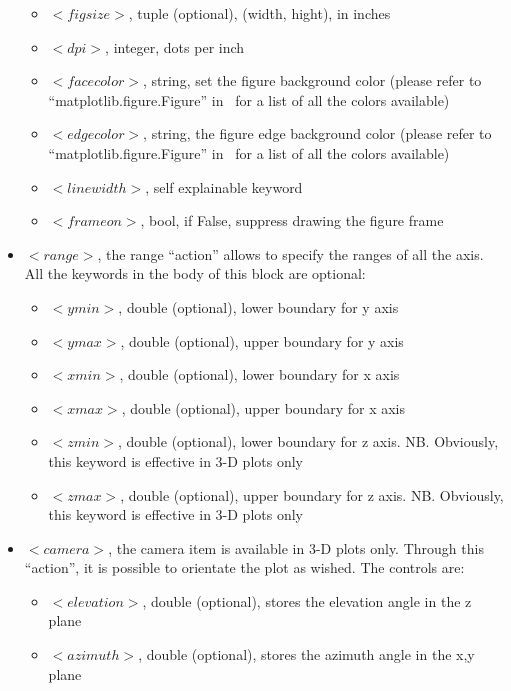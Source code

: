 \begin{itemize}
 \begin{itemize}
        \item \textit{$<figsize>$}, tuple (optional), (width, hight), in inches
        \item \textit{$<dpi>$}, integer, dots per inch
        \item \textit{$<facecolor>$}, string, set the figure background  color (please refer to ``matplotlib.figure.Figure'' in~\cite{MatPlotLib} for a list of all the colors available) 
        \item \textit{$<edgecolor>$}, string, the figure edge background color (please refer to ``matplotlib.figure.Figure'' in~\cite{MatPlotLib} for a list of all the colors available) 
        \item \textit{$<linewidth>$}, self explainable keyword
        \item \textit{$<frameon>$}, bool, if False, suppress drawing the figure frame
      \end{itemize}
\item $<range>$, the range ``action'' allows to specify the ranges of all the axis. All the keywords in the body of this block are optional:
     \begin{itemize}
        \item \textit{$<ymin>$}, double  (optional), lower boundary for y axis
        \item \textit{$<ymax>$}, double  (optional), upper boundary for y axis
        \item \textit{$<xmin>$}, double  (optional), lower boundary for x axis
        \item \textit{$<xmax>$}, double  (optional), upper boundary for x axis 
        \item \textit{$<zmin>$}, double  (optional), lower boundary for z axis. NB. Obviously, this keyword is effective  in 3-D plots only
        \item \textit{$<zmax>$}, double  (optional), upper boundary for z axis. NB. Obviously, this keyword is effective in 3-D plots only
      \end{itemize}
\item $<camera>$, the camera item is available in 3-D plots only. Through this ``action'', it is possible to orientate the plot as wished.  The controls are:
     \begin{itemize}
        \item \textit{$<elevation>$}, double  (optional), stores the elevation angle in the z plane
        \item \textit{$<azimuth>$}, double  (optional), stores the azimuth angle in the x,y plane

\end{itemize}
\end{itemize}
